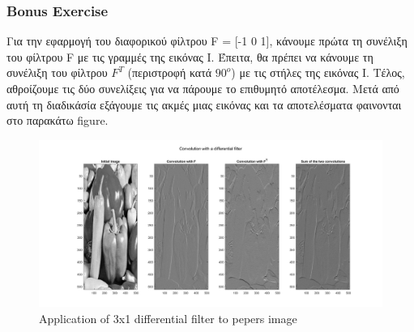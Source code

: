 \documentclass{article}
\begin{document}
	\subsubsection*{Bonus Εxercise}
		Για την εφαρμογή του διαφορικού φίλτρου F = [-1 0 1], κάνουμε πρώτα τη συνέλιξη του φίλτρου F με τις γραμμές της εικόνας Ι. Έπειτα, θα πρέπει να κάνουμε τη συνέλιξη του φίλτρου $F^{T}$ (περιστροφή κατά $90^{ο}$) με τις στήλες της εικόνας Ι. Τέλος, αθροίζουμε τις δύο συνελίξεις για να πάρουμε το επιθυμητό αποτέλεσμα. Μετά από αυτή τη διαδικάσία εξάγουμε τις ακμές μιας εικόνας και τα αποτελέσματα φαινονται στο παρακάτω figure.
		\begin{figure}[h!]
			\centering
			\includegraphics[height=0.35\linewidth, width=\linewidth]{./output_images/img_peppers_dif_filter.jpg}
			\caption{Application of 3x1 differential filter to pepers image}
		\end{figure}
\end{document}
